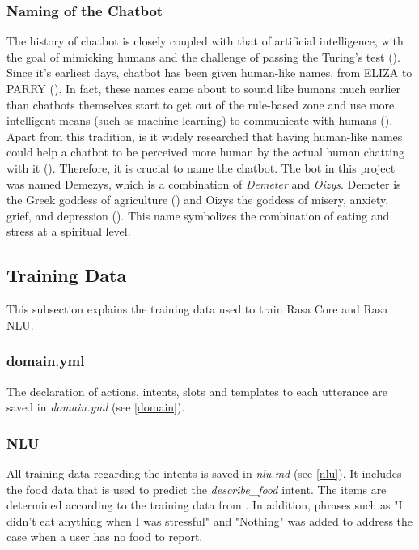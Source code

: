 \subsubsection{Naming of the Chatbot}
The history of chatbot is closely coupled with that of artificial intelligence, with the goal of mimicking humans and the challenge of passing the Turing's test (\cite{38_turing}). Since it's earliest days, chatbot has been given human-like names, from ELIZA to PARRY (\cite{37_early_chatbots_1}). In fact, these names came about to sound like humans much earlier than chatbots themselves start to get out of the rule-based zone and use more intelligent means (such as machine learning) to communicate with humans (\cite{36_early_chatbots}). Apart from this tradition, is it widely researched that having human-like names could help a chatbot to be perceived more human by the actual human chatting with it (\cite{35_chatbot_name_1, 34_chatbot_name}). Therefore, it is crucial to name the chatbot. The bot in this project was named Demezys, which is a combination of \emph{Demeter} and \emph{Oizys}. Demeter is the Greek goddess of agriculture (\cite{39_demeter}) and Oizys the goddess of misery, anxiety, grief, and depression (\cite{40_oizys}). This name symbolizes the combination of eating and stress at a spiritual level.

\subsection{Training Data}
This subsection explains the training data used to train Rasa Core and Rasa NLU.

\subsubsection{domain.yml}
The declaration of actions, intents, slots and templates to each utterance are saved in \emph{domain.yml} (see \autoref{domain}).

\subsubsection{NLU}
All training data regarding the intents is saved in \emph{nlu.md} (see \autoref{nlu}). It includes the food data that is used to predict the \emph{describe\_food} intent. The items are determined according to the training data from \citeauthor{17_ludwig}. In addition, phrases such as "I didn't eat anything when I was stressful" and "Nothing" was added to address the case when a user has no food to report.

